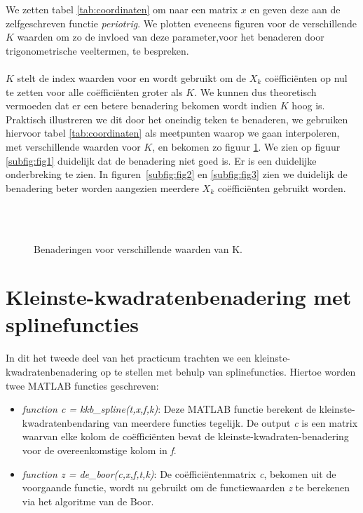 \documentclass[10pt,a4paper]{article}
\begin{document}
\newpage

We zetten tabel \ref{tab:coordinaten} om naar een matrix $x$ en geven deze aan de zelfgeschreven functie \emph{periotrig}. We plotten eveneens figuren voor de verschillende $K$ waarden om zo de invloed van deze parameter,voor het benaderen door trigonometrische veeltermen, te bespreken.\\
\\
$K$ stelt de index waarden voor en wordt gebruikt om de $X_k$ co\"effici\"enten op nul te zetten voor alle co\"effici\"enten groter als $K$. We kunnen dus theoretisch vermoeden dat er een betere benadering bekomen wordt indien $K$ hoog is. Praktisch illustreren we dit door het oneindig teken te benaderen, we gebruiken hiervoor tabel \ref{tab:coordinaten} als meetpunten waarop we gaan interpoleren, met verschillende waarden voor $K$, en bekomen zo figuur \ref{fig:benaderingen}. We zien op figuur \ref{subfig:fig1} duidelijk dat de benadering niet goed is. Er is een duidelijke onderbreking te zien. In figuren~\ref{subfig:fig2} en \ref{subfig:fig3} zien we duidelijk de benadering beter worden aangezien meerdere $X_k$ co\"effici\"enten gebruikt worden. \\

\begin{figure}[h]
\centering
{}\hspace{0.5cm}
\\
\\
\caption{Benaderingen voor verschillende waarden van K.}
\label{fig:benaderingen}
\end{figure}


\newpage

\section{Kleinste-kwadratenbenadering met splinefuncties}

In dit het tweede deel van het practicum trachten we een kleinste-kwadratenbenadering op te stellen met behulp van splinefuncties. Hiertoe worden twee MATLAB functies geschreven: 

\begin{itemize}
	\item{\emph{function c = kkb\_spline(t,x,f,k)}: Deze MATLAB functie berekent de kleinste-kwadratenbendaring van meerdere functies tegelijk. De output \emph{c} is een matrix waarvan elke kolom de co\"effici\"enten bevat de kleinste-kwadraten-benadering voor de overeenkomstige kolom in \emph{f}.}
	\item{\emph{function z = de\_boor(c,x,f,t,k)}: De co\"effici\"entenmatrix \emph{c}, bekomen uit de voorgaande functie, wordt nu gebruikt om de functiewaarden \emph{z} te berekenen via het algoritme van de Boor.}
\end{itemize}
\end{document}
